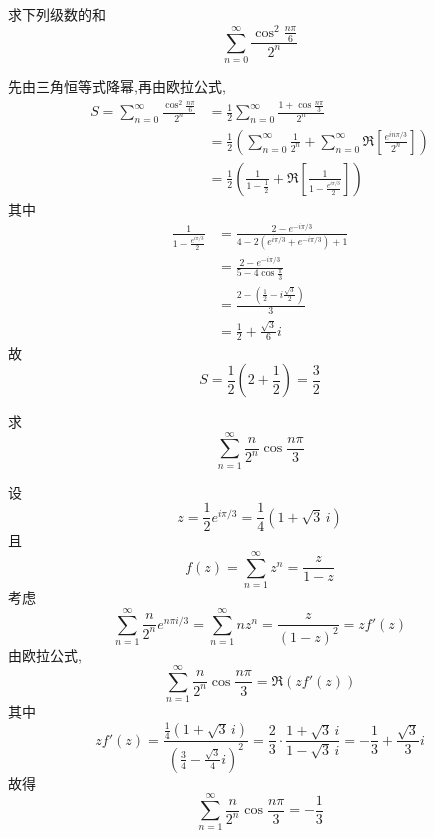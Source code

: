 \begin{questions}
    \question 求下列级数的和
    \[
    \sum_{n=0}^{\infty} \frac{\cos^2\frac{n\pi}{6}}{2^n}
    \]
    \begin{solution}
        先由三角恒等式降幂,再由欧拉公式,
        \begin{align*}
        S=\sum_{n=0}^{\infty} \frac{\cos^2\frac{n\pi}{6}}{2^n} 
        &= \frac{1}{2} \sum_{n=0}^{\infty} \frac{1+\cos\frac{n\pi}{3}}{2^n}\\
        &=\frac{1}{2} \left(\sum_{n=0}^{\infty} \frac{1}{2^n} + \sum_{n=0}^{\infty} \Re \left[\frac{e^{in\pi/3}}{2^n} \right]\right) \\
        &=\frac{1}{2} \left(\frac{1}{1-\frac{1}{2}}+\Re \left[\frac{1}{1 - \frac{e^{i\pi/3}}{2}}\right]\right)
        \end{align*}
        其中
        \begin{align*}
        \frac{1}{1 - \frac{e^{i\pi/3}}{2}} 
        &= \frac{2 - e^{-i\pi/3}}{4 - 2(e^{i\pi/3} + e^{-i\pi/3}) + 1} \\
        &= \frac{2 - e^{-i\pi/3}}{5 - 4\cos\frac{\pi}{3}} \\
        &= \frac{2 - (\frac{1}{2} - i\frac{\sqrt{3}}{2})}{3} \\
        &= \frac{1}{2}+\frac{\sqrt{3}}{6}i
        \end{align*}
        故
        \[
        S = \frac{1}{2}\left( 2 + \frac{1}{2}\right) = \frac{3}{2}
        \]
    \end{solution}

    \question 求 
    \[
    \sum_{n=1}^{\infty}\frac{n}{2^{n}}\cos\frac{n\pi}{3}
    \]
    \begin{solution}
        设
        \[
        z=\frac{1}{2}e^{i\pi/3}=\frac{1}{4}(1+\sqrt 3\, i)
        \]
        且
        \[
        f(z) =\sum_{n=1}^\infty z^n = \frac{z}{1-z}
        \]
        考虑
        \[
        \sum_{n=1}^\infty \frac{n}{2^n} e^{n\pi i/3} = \sum_{n=1}^\infty n z^{n} = \frac{z}{(1-z)^2} = zf'(z)
        \]
        由欧拉公式,
        \[
        \sum_{n=1}^\infty \frac{n}{2^n}\cos\frac{n\pi}{3}=\Re(zf'(z)) 
        \]
        其中
        \[
        zf'(z)
        = \frac{\frac{1}{4}(1+\sqrt{3}\,i)}{\left(\frac{3}{4}-\frac{\sqrt 3}{4} i\right)^2}
        = \frac{2}{3}\cdot \frac{1+\sqrt 3\, i}{1-\sqrt 3\, i}
        = -\frac{1}{3}+\frac{\sqrt 3}{3} i
        \]
        故得
        \[
        \sum_{n=1}^\infty \frac{n}{2^n}\cos\frac{n\pi}{3} = -\frac{1}{3}
        \]
    \end{solution}


\end{questions}
